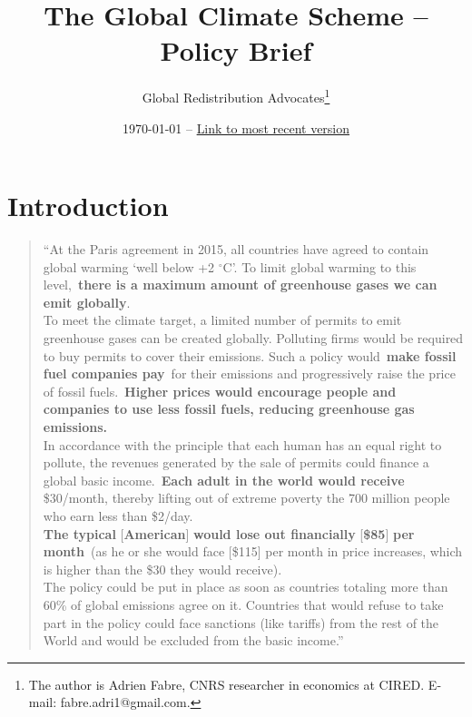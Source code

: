 \documentclass[12pt,english]{article}
\title{The Global Climate Scheme -- Policy Brief
}
\author{Global Redistribution Advocates\footnote{The author is Adrien Fabre, CNRS researcher in economics at CIRED. E-mail: fabre.adri1@gmail.com.}}
\date{\today{} -- \href{https://github.com/bixiou/global_tax_attitudes/raw/main/paper/policy_brief_GCS.pdf}{Link to most recent version}}
\begin{document}
\maketitle




\section{Introduction}\label{sec:intro}

\begin{quote}
  ``At the Paris agreement in 2015, all countries have agreed to contain global warming `well below +2 $\mathrm{{}^\circ}$C'. To limit global warming to this level,~\textbf{there is a maximum amount of greenhouse gases we can emit globally}.\\
  To meet the climate target, a limited number of permits to emit greenhouse gases can be created globally. Polluting firms would be required to buy permits to cover their emissions. Such a policy would~\textbf{make fossil fuel companies pay}~for their emissions and progressively raise the price of fossil fuels.~\textbf{Higher prices would encourage people and companies to use less fossil fuels, reducing greenhouse gas emissions.}\\
  In accordance with the principle that each human has an equal right to pollute, the revenues generated by the sale of permits could finance a global basic income.~\textbf{Each adult in the world would receive } \$30/month, thereby lifting out of extreme poverty the 700 million people who earn less than \$2/day.\\
  \textbf{The typical }[\textbf{American}]\textbf{ would lose out financially }[\textbf{\$85}]\textbf{ per month}~(as he or she would face [\$115] per month in price increases, which is higher than the \$30 they would receive).\\
  The policy could be put in place as soon as countries totaling more than 60\% of global emissions agree on it. Countries that would refuse to take part in the policy could face sanctions (like tariffs) from the rest of the World and would be excluded from the basic income.''
\end{quote}
\end{document}
